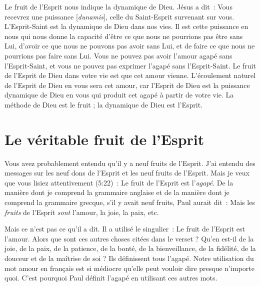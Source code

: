 \og Le fruit de l'Esprit \fg{} nous indique la dynamique de Dieu.
 Jésus a dit~: \og Vous recevrez une puissance [\emph{dunamis}],
 celle du Saint-Esprit survenant sur vous. \fg{}
 L'Esprit-Saint est la dynamique de Dieu dans nos vies.
 Il est cette puissance en nous qui nous donne la capacité
 d'être ce que nous ne pourrions pas être sans Lui,
 d'avoir ce que nous ne pouvons pas avoir sans Lui,
 et de faire ce que nous ne pourrions pas faire sans Lui.
 Vous ne pouvez pas avoir l'amour agapé sans l'Esprit-Saint,
 et vous ne pouvez pas exprimer l'agapé sans l'Esprit-Saint.
 Le fruit de l'Esprit de Dieu dans votre vie est que cet amour vienne.
 L'écoulement naturel de l'Esprit de Dieu en vous sera cet amour,
 car l'Esprit de Dieu est la puissance dynamique de Dieu
 en vous qui produit cet agapé à partir de votre vie.
 La méthode de Dieu est le fruit ; la dynamique de Dieu est l'Esprit.


\section*{Le véritable fruit de l'Esprit}

Vous avez probablement entendu qu'il y a neuf fruits de l'Esprit.
 J'ai entendu des messages sur les neuf dons de l'Esprit
 et les neuf fruits de l'Esprit. Mais je veux que vous lisiez
 attentivement (5:22)~:
 \og Le fruit de l'Esprit est l'\emph{agapé}. \fg{}
 De la manière dont je comprend la grammaire anglaise
 et de la manière dont je comprend la grammaire grecque,
 s'il y avait neuf fruits, Paul aurait dit~:
 \og Mais les \emph{fruits} de l'Esprit \emph{sont} l'amour,
 la joie, la paix, etc. \fg{}

Mais ce n'est pas ce qu'il a dit. Il a utilisé le singulier~:
 \og Le fruit de l'Esprit est l'amour. \fg{}
 Alors que sont ces autres choses citées dans le verset ?
 Qu'en est-il de la joie, de la paix, de la patience, de la bonté,
 de la bienveillance, de la fidélité, de la douceur
 et de la maîtrise de soi ? Ils définissent tous l'agapé.
 Notre utilisation du mot \og amour \fg{} en français est si médiocre
 qu'elle peut vouloir dire presque n'importe quoi.
 C'est pourquoi Paul définit l'agapé en utilisant ces autres mots.

